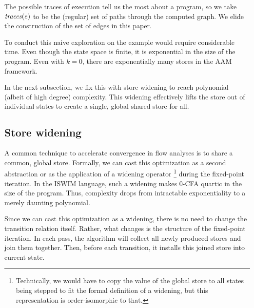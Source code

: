 \documentclass[9pt]{sigplanconf} %
\newcommand{\naive}{naive}
\begin{document}
The possible traces of execution tell us the most about a program, so we take $\mathit{traces}(e)$ to be the (regular) set of paths through the computed graph.
%
 We elide the construction of the set of edges in this paper.

To conduct this \naive{} exploration on the \Church{} example would require considerable time.
%
  Even though the state space is finite, it is exponential in the size of the program.
%
  Even with $k = 0$, there are exponentially many stores in the AAM framework.

In the next subsection, we fix this with store widening to reach polynomial (albeit of high degree) complexity.
%
This widening effectively lifts the store out of individual states to create a single, global shared store for all.


\subsection{Store widening}
\label{sec:storewiden}

A common technique to accelerate convergence in flow analyses is to share a common, global store.
%
Formally, we can cast this optimization as a second abstraction or as the application of a widening operator
%
\footnote{Technically, we would have to copy the value of the global store to all states being stepped to fit the formal definition of a widening, but this representation is order-isomorphic to that.}
%
during the fixed-point iteration.
%
In the ISWIM language, such a widening makes 0-CFA quartic in the size of the program.
%
Thus, complexity drops from intractable exponentiality to a merely daunting polynomial.

Since we can cast this optimization as a widening, there is no need to change the transition relation itself.
%
Rather, what changes is the structure of the fixed-point iteration.
%
In each pass, the algorithm will collect all newly produced stores and join them together.
%
Then, before each transition, it installs this joined store into current state.
\end{document}
